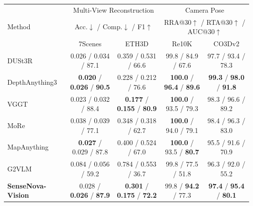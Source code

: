 \begin{table}[t]
    \centering
    \small
    \setlength{\tabcolsep}{6pt}
    \begin{tabular}{l|cc|cc}
        \toprule
        \multirow{3}{*}{Method} & \multicolumn{2}{c|}{Multi-View Reconstruction} & \multicolumn{2}{c}{Camera Pose} \\
        & \multicolumn{2}{c|}{Acc.$\downarrow$ / Comp.$\downarrow$ / F1$\uparrow$} & \multicolumn{2}{c}{RRA@30$\uparrow$ / RTA@30$\uparrow$ / AUC@30$\uparrow$} \\
        \cmidrule(lr){2-3} \cmidrule(lr){4-5}
        & \multicolumn{1}{c}{7Scenes} & \multicolumn{1}{c|}{ETH3D} & \multicolumn{1}{c}{Re10K} & \multicolumn{1}{c}{CO3Dv2} \\
        \midrule
        DUSt3R~\cite{dust3r}                     & 0.026 / 0.034 / 87.1                            & 0.359 / 0.531 / 66.6                            & 99.8 / 84.9 / 67.6                             & 97.7 / 93.4 / 78.3                            \\
        DepthAnything3~\cite{depthanything3}     & \textbf{0.020} / \textbf{0.026} / \textbf{90.5} & 0.228 / 0.212 / 76.6                            & \textbf{100.0} / \textbf{96.4} / \textbf{89.6} & \textbf{99.3} / \textbf{98.0} / \textbf{91.8} \\
        VGGT~\cite{vggt}                         & 0.023 / 0.032 / 88.4                            & \textbf{0.177} / \textbf{0.155} / \textbf{80.9} & \textbf{100.0} / 93.5 / 79.3                   & 98.3 / 96.6 / 89.2                            \\
        MoRe~\cite{MoRe4d2026}                   & 0.038 / 0.039 / 77.1                            & 0.348 / 0.318 / 62.7                            & \textbf{100.0} / 94.0 / 79.1                   & 98.4 / 96.3 / 83.0                            \\
        \midrule
        MapAnything~\cite{keetha2026mapanything} & \textbf{0.027} / 0.029 / 87.8                   & 0.400 / 0.524 / 67.0                            & \textbf{100.0} / 93.5 / \textbf{80.7}          & 95.5 / 91.6 / 70.9                            \\
        G2VLM~\cite{g2vlm}                       & 0.084 / 0.056 / 59.2                            & 0.784 / 0.553 / 36.7                            & 99.8 / 77.5 / 51.8                             & 96.3 / 92.0 / 55.2                            \\
        \textbf{SenseNova-Vision}                & 0.028 / \textbf{0.026} / \textbf{87.9}          & \textbf{0.301} / \textbf{0.175} / \textbf{72.2} & 99.8 / \textbf{94.2} / 77.3                    & \textbf{97.4} / \textbf{95.4} / \textbf{80.1} \\

\end{tabular}
\end{table}
